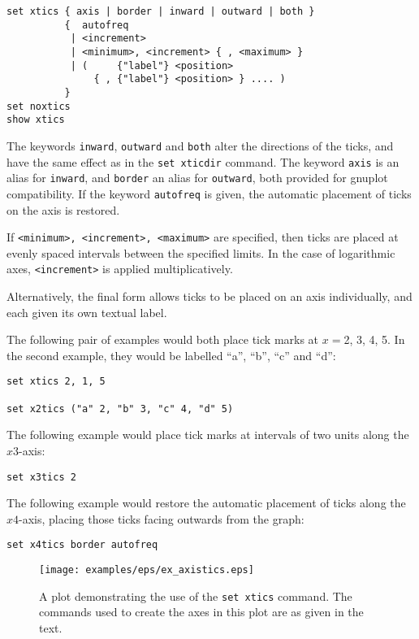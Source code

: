 \begin{verbatim}
set xtics { axis | border | inward | outward | both }
          {  autofreq
           | <increment>
           | <minimum>, <increment> { , <maximum> }
           | (     {"label"} <position>
               { , {"label"} <position> } .... )
          }
set noxtics
show xtics
\end{verbatim}

The keywords \texttt{inward}, \texttt{outward} and \texttt{both} alter the
directions of the ticks, and have the same effect as in the \texttt{set
xticdir} command. The keyword \texttt{axis} is an alias for \texttt{inward},
and \texttt{border} an alias for \texttt{outward}, both provided for gnuplot
compatibility. If the keyword \texttt{autofreq} is given, the automatic
placement of ticks on the axis is restored.

If \texttt{<minimum>, <increment>, <maximum>} are specified, then ticks are
placed at evenly spaced intervals between the specified limits. In the case of
logarithmic axes, \texttt{<increment>} is applied multiplicatively.

Alternatively, the final form allows ticks to be placed on an axis
individually, and each given its own textual label.

The following pair of examples would both place tick marks at $x=$2, 3, 4, 5.
In the second example, they would be labelled ``a'', ``b'', ``c'' and ``d'':

\begin{verbatim}
set xtics 2, 1, 5

set x2tics ("a" 2, "b" 3, "c" 4, "d" 5)
\end{verbatim}

The following example would place tick marks at intervals of two units along
the $x3$-axis:

\begin{verbatim}
set x3tics 2
\end{verbatim}

The following example would restore the automatic placement of ticks along the
$x4$-axis, placing those ticks facing outwards from the graph:

\begin{verbatim}
set x4tics border autofreq
\end{verbatim}

\begin{figure}
\begin{center}
\texttt{[image: examples/eps/ex\_axistics.eps]}
\end{center}
\caption{A plot demonstrating the use of the {\tt set xtics} command. The commands used to create the axes in this plot are as given in the text.}
\label{fig:ex_axistics}
\end{figure}


